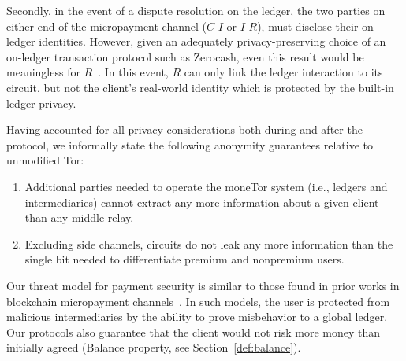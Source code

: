 Secondly, in the event of a dispute resolution on the ledger, the two parties on
either end of the micropayment channel ($C$-$I$ or $I$-$R$), must disclose their
on-ledger identities. 
However, given an adequately privacy-preserving choice of an on-ledger
transaction protocol such as Zerocash, even this result would be meaningless for
$R$~\cite{sasson2014zerocash}. In this event, $R$ can only link the ledger
interaction to its circuit, but not the client's real-world identity which is
protected by the built-in ledger privacy.

Having accounted for all privacy considerations both during and after the
protocol, we informally state the following anonymity guarantees relative to
unmodified Tor:

\begin{enumerate}
\item Additional parties needed to operate the moneTor system (i.e., ledgers and
  intermediaries) cannot extract any more information about a given client than
  any middle relay.
\item Excluding side channels, circuits do not leak any more information than
  the single bit needed to differentiate premium and nonpremium users.
\end{enumerate}

Our threat model for payment security is similar to those found in prior works
in blockchain micropayment channels~\cite{poon2016bitcoin}. In such models, the
user is protected from malicious intermediaries by the ability to prove
misbehavior to a global ledger. Our protocols also guarantee that the client
would not risk more money than initially agreed (Balance property, see
Section~\ref{def:balance}).

